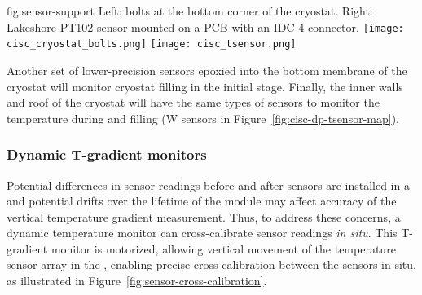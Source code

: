 \begin{dunefigure}{fig:sensor-support}
  {Left: bolts at the bottom corner of the cryostat. Right: Lakeshore PT102 sensor mounted on a PCB with an IDC-4 connector.}
  \texttt{[image: cisc\_cryostat\_bolts.png]}%
    \hspace{1cm}%
  \texttt{[image: cisc\_tsensor.png]}%
\end{dunefigure}


Another set of lower-precision sensors epoxied into the bottom membrane of the cryostat will monitor  cryostat filling in the initial stage.   
Finally, the inner walls and roof of the cryostat will have the same types of sensors to monitor the temperature during \cooldown and filling (W sensors in Figure~\ref{fig:cisc-dp-tsensor-map}).
 

\subsubsection{Dynamic T-gradient monitors}
\label{sec:fdgen-slow-cryo-dynamic-therm}

 Potential differences in sensor readings before and after sensors are installed in a  and potential drifts over the lifetime of the %
 module may affect accuracy of the vertical temperature gradient measurement. Thus, to address these concerns, %
 a dynamic temperature monitor can cross-calibrate  sensor readings %
 \textit{in situ}.
This T-gradient monitor is motorized, allowing vertical movement of the temperature sensor array %
in the , %
enabling precise cross-calibration between the sensors %
in situ, as illustrated in Figure~\ref{fig:sensor-cross-calibration}.  

